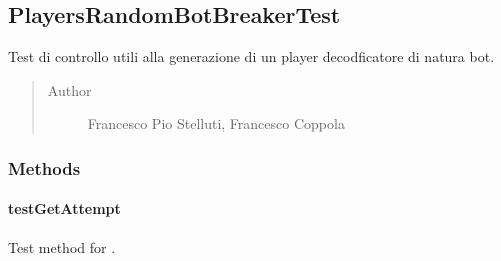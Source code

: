 \documentclass[letterpaper,10pt,italian]{sphinxmanual}
\begin{document}
\subsection{PlayersRandomBotBreakerTest}
\label{\detokenize{test/it/unicam/cs/pa/mastermind/test/PlayersRandomBotBreakerTest:playersrandombotbreakertest}}\label{\detokenize{test/it/unicam/cs/pa/mastermind/test/PlayersRandomBotBreakerTest::doc}}

\begin{fulllineitems}
\label{\detokenize{test/it/unicam/cs/pa/mastermind/test/PlayersRandomBotBreakerTest:it.unicam.cs.pa.mastermind.test.PlayersRandomBotBreakerTest}}
Test di controllo utili alla generazione di un player decodficatore di natura bot.
\begin{quote}\begin{description}
\item[{Author}] \leavevmode
Francesco Pio Stelluti, Francesco Coppola

\end{description}\end{quote}

\end{fulllineitems}



\subsubsection{Methods}
\label{\detokenize{test/it/unicam/cs/pa/mastermind/test/PlayersRandomBotBreakerTest:methods}}

\paragraph{testGetAttempt}
\label{\detokenize{test/it/unicam/cs/pa/mastermind/test/PlayersRandomBotBreakerTest:testgetattempt}}

\begin{fulllineitems}
\label{\detokenize{test/it/unicam/cs/pa/mastermind/test/PlayersRandomBotBreakerTest:it.unicam.cs.pa.mastermind.test.PlayersRandomBotBreakerTest.testGetAttempt()}}
Test method for .

\end{fulllineitems}
\end{document}
